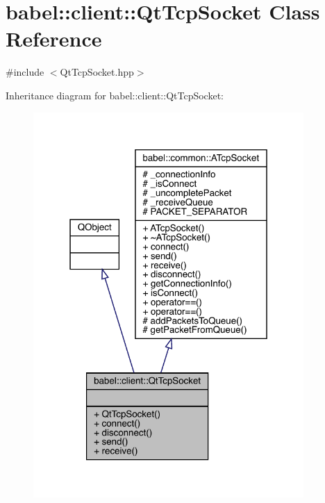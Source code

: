\hypertarget{classbabel_1_1client_1_1_qt_tcp_socket}{}\section{babel\+:\+:client\+:\+:Qt\+Tcp\+Socket Class Reference}
\label{classbabel_1_1client_1_1_qt_tcp_socket}


{\ttfamily \#include $<$Qt\+Tcp\+Socket.\+hpp$>$}



Inheritance diagram for babel\+:\+:client\+:\+:Qt\+Tcp\+Socket\+:\nopagebreak
\begin{figure}[H]
\begin{center}
\leavevmode
\includegraphics[width=292pt]{classbabel_1_1client_1_1_qt_tcp_socket__inherit__graph}
\end{center}
\end{figure}


